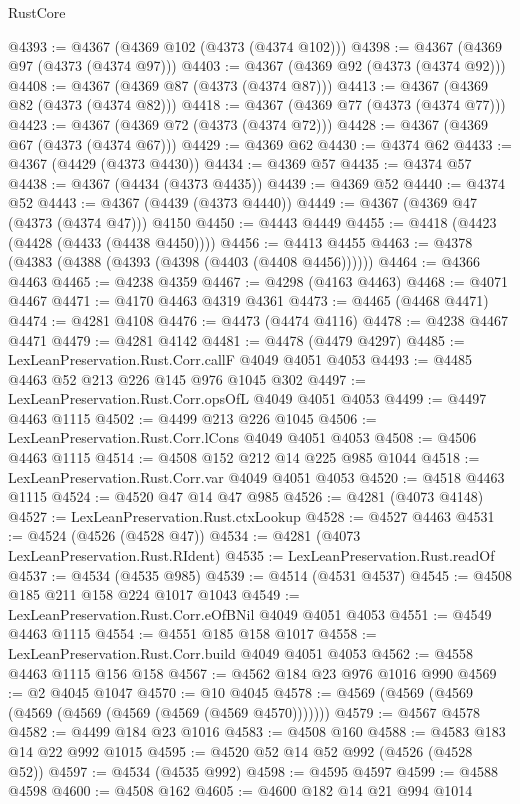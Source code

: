 \begin{lexlean}{RustCore}
\begin{coremodule}
@4393 := @4367 (@4369 @102 (@4373 (@4374 @102)))
@4398 := @4367 (@4369 @97 (@4373 (@4374 @97)))
@4403 := @4367 (@4369 @92 (@4373 (@4374 @92)))
@4408 := @4367 (@4369 @87 (@4373 (@4374 @87)))
@4413 := @4367 (@4369 @82 (@4373 (@4374 @82)))
@4418 := @4367 (@4369 @77 (@4373 (@4374 @77)))
@4423 := @4367 (@4369 @72 (@4373 (@4374 @72)))
@4428 := @4367 (@4369 @67 (@4373 (@4374 @67)))
@4429 := @4369 @62
@4430 := @4374 @62
@4433 := @4367 (@4429 (@4373 @4430))
@4434 := @4369 @57
@4435 := @4374 @57
@4438 := @4367 (@4434 (@4373 @4435))
@4439 := @4369 @52
@4440 := @4374 @52
@4443 := @4367 (@4439 (@4373 @4440))
@4449 := @4367 (@4369 @47 (@4373 (@4374 @47))) @4150
@4450 := @4443 @4449
@4455 := @4418 (@4423 (@4428 (@4433 (@4438 @4450))))
@4456 := @4413 @4455
@4463 := @4378 (@4383 (@4388 (@4393 (@4398 (@4403 (@4408 @4456))))))
@4464 := @4366 @4463
@4465 := @4238 @4359
@4467 := @4298 (@4163 @4463)
@4468 := @4071 @4467
@4471 := @4170 @4463 @4319 @4361
@4473 := @4465 (@4468 @4471)
@4474 := @4281 @4108
@4476 := @4473 (@4474 @4116)
@4478 := @4238 @4467 @4471
@4479 := @4281 @4142
@4481 := @4478 (@4479 @4297)
@4485 := LexLeanPreservation.Rust.Corr.callF @4049 @4051 @4053
@4493 := @4485 @4463 @52 @213 @226 @145 @976 @1045 @302
@4497 := LexLeanPreservation.Rust.Corr.opsOfL @4049 @4051 @4053
@4499 := @4497 @4463 @1115
@4502 := @4499 @213 @226 @1045
@4506 := LexLeanPreservation.Rust.Corr.lCons @4049 @4051 @4053
@4508 := @4506 @4463 @1115
@4514 := @4508 @152 @212 @14 @225 @985 @1044
@4518 := LexLeanPreservation.Rust.Corr.var @4049 @4051 @4053
@4520 := @4518 @4463 @1115
@4524 := @4520 @47 @14 @47 @985
@4526 := @4281 (@4073 @4148)
@4527 := LexLeanPreservation.Rust.ctxLookup
@4528 := @4527 @4463
@4531 := @4524 (@4526 (@4528 @47))
@4534 := @4281 (@4073 LexLeanPreservation.Rust.RIdent)
@4535 := LexLeanPreservation.Rust.readOf
@4537 := @4534 (@4535 @985)
@4539 := @4514 (@4531 @4537)
@4545 := @4508 @185 @211 @158 @224 @1017 @1043
@4549 := LexLeanPreservation.Rust.Corr.eOfBNil @4049 @4051 @4053
@4551 := @4549 @4463 @1115
@4554 := @4551 @185 @158 @1017
@4558 := LexLeanPreservation.Rust.Corr.build @4049 @4051 @4053
@4562 := @4558 @4463 @1115 @156 @158
@4567 := @4562 @184 @23 @976 @1016 @990
@4569 := @2 @4045 @1047
@4570 := @10 @4045
@4578 := @4569 (@4569 (@4569 (@4569 (@4569 (@4569 (@4569 (@4569 @4570)))))))
@4579 := @4567 @4578
@4582 := @4499 @184 @23 @1016
@4583 := @4508 @160
@4588 := @4583 @183 @14 @22 @992 @1015
@4595 := @4520 @52 @14 @52 @992 (@4526 (@4528 @52))
@4597 := @4534 (@4535 @992)
@4598 := @4595 @4597
@4599 := @4588 @4598
@4600 := @4508 @162
@4605 := @4600 @182 @14 @21 @994 @1014

\end{coremodule}
\end{lexlean}
